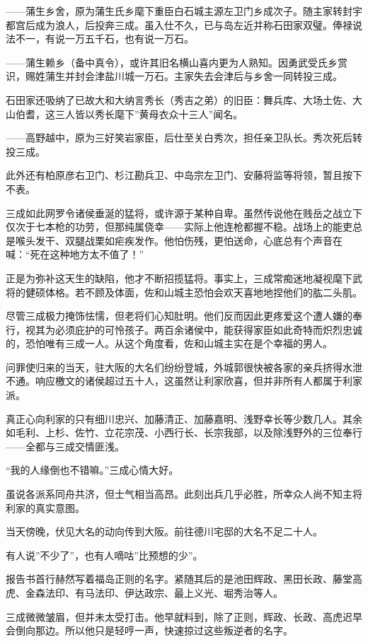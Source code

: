 \documentclass[
]{book}
\begin{document}
------蒲生乡舍，原为蒲生氏乡麾下重臣白石城主源左卫门乡成次子。随主家转封宇都宫后成为浪人，后投奔三成。虽入仕不久，已与岛左近并称石田家双璧。俸禄说法不一，有说一万五千石，也有说一万石。

------蒲生赖乡（备中真令），或许其旧名横山喜内更为人熟知。因勇武受氏乡赏识，赐姓蒲生并封会津盐川城一万石。主家失去会津后与乡舍一同转投三成。

石田家还吸纳了已故大和大纳言秀长（秀吉之弟）的旧臣：舞兵库、大场土佐、大山伯耆，这三人皆以秀长麾下''黄母衣众十三人''闻名。

------高野越中，原为三好笑岩家臣，后仕至关白秀次，担任亲卫队长。秀次死后转投三成。

此外还有柏原彦右卫门、杉江勘兵卫、中岛宗左卫门、安藤将监等将领，暂且按下不表。

三成如此网罗令诸侯垂涎的猛将，或许源于某种自卑。虽然传说他在贱岳之战立下仅次于七本枪的功劳，但那纯属侥幸------实际上他连枪都握不稳。战场上的能吏总是喉头发干、双腿战栗如疟疾发作。他怕伤残，更怕送命，心底总有个声音在喊：``死在这种地方太不值了！''

正是为弥补这天生的缺陷，他才不断招揽猛将。事实上，三成常痴迷地凝视麾下武将的健硕体格。若不顾及体面，佐和山城主恐怕会欢天喜地地捏他们的肱二头肌。

尽管三成极力掩饰怯懦，但老将们心知肚明。他们反而因此更疼爱这个遭人嫌的奉行，视其为必须庇护的可怜孩子。两百余诸侯中，能获得家臣如此奇特而炽烈忠诚的，恐怕唯有三成一人。从这个角度看，佐和山城主实在是个幸福的男人。

问罪使归来的当天，驻大阪的大名们纷纷登城，外城郭很快被各家的亲兵挤得水泄不通。响应檄文的诸侯超过五十人，这虽然让利家欣喜，但并非所有人都属于利家派。

真正心向利家的只有细川忠兴、加藤清正、加藤嘉明、浅野幸长等少数几人。其余如毛利、上杉、佐竹、立花宗茂、小西行长、长宗我部，以及除浅野外的三位奉行------全都与三成交情匪浅。

``我的人缘倒也不错嘛。''三成心情大好。

虽说各派系同舟共济，但士气相当高昂。此刻出兵几乎必胜，所幸众人尚不知主将利家的真实意图。

当天傍晚，伏见大名的动向传到大阪。前往德川宅邸的大名不足二十人。

有人说''不少了''，也有人嘀咕''比预想的少''。

报告书首行赫然写着福岛正则的名字。紧随其后的是池田辉政、黑田长政、藤堂高虎、金森法印、有马法印、伊达政宗、最上义光、堀秀治等人。

三成微微皱眉，但并未太受打击。他早就料到，除了正则，辉政、长政、高虎迟早会倒向那边。所以他只是轻哼一声，快速掠过这些叛逆者的名字。
\end{document}
